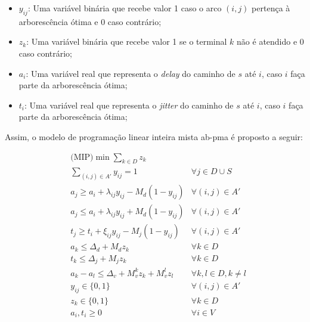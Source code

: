 \begin{itemize}
 \item $y_{ij}$: Uma  variável binária que recebe valor 1  caso o arco
   $(i, j)$ pertença à arborescência ótima e 0 caso contrário;
 \item $z_{k}$: Uma variável binária que  recebe valor 1 se o terminal
   $k$ não é atendido e 0 caso contrário;
 \item $a_{i}$: Uma  variável real que representa  o \textit{delay} do
   caminho de $s$ até $i$, caso $i$ faça parte da arborescência ótima;
 \item $t_{i}$: Uma variável real  que representa o \textit{jitter} do
   caminho de $s$ até $i$, caso $i$ faça parte da arborescência ótima;
\end{itemize}

Assim, o  modelo de  programação linear  inteira mista  \gls{ab-pma} é
proposto a seguir:

\begin{align}
 & \text{(MIP)} \min \sum_{k \in D} z_k & \label{eq:ab-fo} \\ 
 & \sum_{(i, j) \in A'} y_{ij} = 1 & \forall j \in D \cup S \label{eq:spanning} \\
 & a_j \geq a_i + \lambda_{ij} y_{ij} - M_d(1 - y_{ij}) & \forall (i, j) \in A' \label{eq:lambda-geq} \\
 & a_j \leq a_i + \lambda_{ij} y_{ij} + M_d(1 - y_{ij}) & \forall (i, j) \in A' \label{eq:lambda-leq} \\
 & t_j \geq t_i + \xi_{ij} y_{ij} - M_j(1 - y_{ij})& \forall (i, j) \in A' \label{eq:xi-geq} \\
 & a_k \leq \Delta_d + M_d z_k & \forall k \in D \label{eq:lim-delay} \\
 & t_k \leq \Delta_j + M_j z_k & \forall k \in D \label{eq:lim-jitter} \\
 & a_k - a_l \leq \Delta_v + M_v^k z_k + M_v^l z_l & \forall k, l \in D, k \neq l \label{eq:lim-var} \\
 & y_{ij} \in \{0, 1\} & \forall (i, j) \in A' \label{eq:ab-dom-y} \\
 & z_{k} \in \{0, 1\} & \forall k \in D \label{eq:ab-dom-z}\\
 & a_i, t_i \geq 0 & \forall i \in V \label{eq:ab-dom-l-t} 
\end{align}

